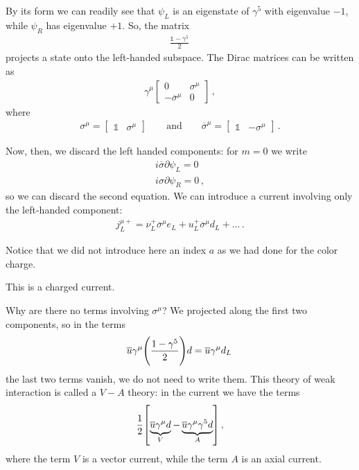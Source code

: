 \documentclass[main.tex]{subfiles}
\begin{document}
By its form we can readily see that \(\psi_{L}\) is an eigenstate of \(\gamma^{5}\) with eigenvalue \(-1\), while \(\psi_{R}\) has eigenvalue \(+1\). 
So, the matrix 
%
\begin{align}
\frac{\mathbb{1} - \gamma^{5}}{2} 
\,
\end{align}
%
projects a state onto the left-handed subspace.
The Dirac matrices can be written as 
%
\begin{align}
\gamma^{\mu } \left[\begin{array}{cc}
0 & \sigma^{\mu }  \\ 
-\overline{\sigma}^{\mu } & 0
\end{array}\right]
\,,
\end{align}
%
where 
%
\begin{align}
\sigma^{\mu } = \left[\begin{array}{cc}
\mathbb{1} & \sigma^{\mu }
\end{array}\right]
\qquad \text{and} \qquad
\overline{\sigma}^{\mu } = \left[\begin{array}{cc}
\mathbb{1} & - \sigma^{\mu }
\end{array}\right]
\,.
\end{align}
%

Now, then, we discard the left handed components: for \(m=0\) we write 
%
\begin{align}
i \overline{\sigma} \partial \psi_{L} =0\\
i \sigma \partial \psi_{R}=0
\,,
\end{align}
%
so we can discard the second equation. 
We can introduce a current involving only the left-handed component: 
%
\begin{align}
j^{\mu +}_{L} = \nu ^+_{L} \overline{\sigma}^{\mu } e_{L} + u ^+_{L} \overline{\sigma}^{\mu } d_{L} + \dots
\,.
\end{align}

Notice that we did not introduce here an index \(a\) as we had done for the color charge. 

This is a charged current.

Why are there no terms involving \(\sigma^{\mu }\)? We projected along the first two components, so in the terms 
%
\begin{align}
\overline{u} \gamma^{\mu } \qty( \frac{1-\gamma^{5}}{2})d = \overline{u} \gamma^{\mu } d_L
\,
\end{align}
%
the last two terms vanish, we do not need to write them.
This theory of weak interaction is called a \(V-A\) theory: in the current we have the terms 
%
\begin{align}
\frac{1}{2} \qty[ \underbrace{\overline{u} \gamma^{\mu } d}_{V} - \underbrace{\overline{u} \gamma^{\mu } \gamma^{5} d}_{A}]
\,,
\end{align}
%
where the term \(V\) is a vector current, while the term \(A\) is an axial current. 
\end{document}
